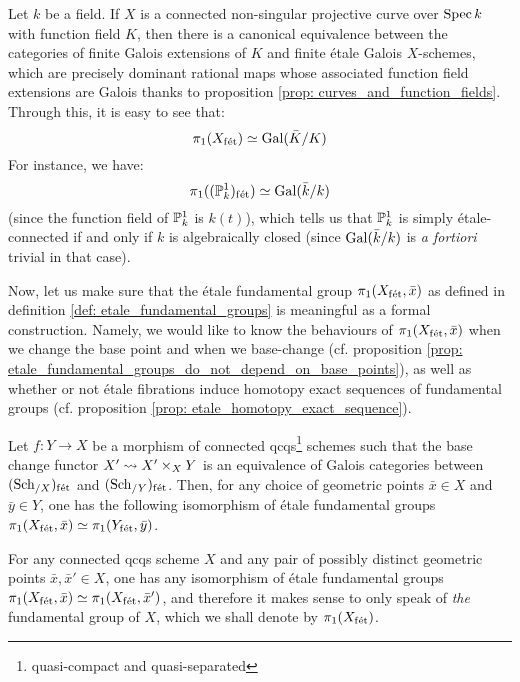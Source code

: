             \begin{example} \label{example: etale_fundamental_group_of_a_curve}
                Let $k$ be a field. If $X$ is a connected non-singular projective curve over $\Spec k$ with function field $K$, then there is a canonical equivalence between the categories of finite Galois extensions of $K$ and finite \'etale Galois $X$-schemes, which are precisely dominant rational maps whose associated function field extensions are Galois thanks to proposition \ref{prop: curves_and_function_fields}. Through this, it is easy to see that:
                    $$\pi_1(X_{\fet}) \cong \Gal(\bar{K}/K)$$
                For instance, we have:
                    $$\pi_1((\P^1_k)_{\fet}) \cong \Gal(\bar{k}/k)$$
                (since the function field of $\P^1_k$ is $k(t)$), which tells us that $\P^1_k$ is simply \'etale-connected if and only if $k$ is algebraically closed (since $\Gal(\bar{k}/k)$ is \textit{a fortiori} trivial in that case). 
            \end{example}
            
            Now, let us make sure that the \'etale fundamental group $\pi_1(X_{\fet}, \bar{x})$ as defined in definition \ref{def: etale_fundamental_groups} is meaningful as a formal construction. Namely, we would like to know the behaviours of $\pi_1(X_{\fet}, \bar{x})$ when we change the base point and when we base-change (cf. proposition \ref{prop: etale_fundamental_groups_do_not_depend_on_base_points}), as well as whether or not \'etale fibrations induce homotopy exact sequences of fundamental groups (cf. proposition \ref{prop: etale_homotopy_exact_sequence}). 
            \begin{proposition} \label{prop: etale_fundamental_groups_do_not_depend_on_base_points}
                \cite[\href{https://stacks.math.columbia.edu/tag/0BQA}{Tag 0BQA}]{stacks} Let $f: Y \to X$ be a morphism of connected qcqs\footnote{quasi-compact and quasi-separated} schemes such that the base change functor $X' \mapsto X' \x_X Y$ is an equivalence of Galois categories between $(\Sch_{/X})_{\fet}$ and $(\Sch_{/Y})_{\fet}$. Then, for any choice of geometric points $\bar{x} \in X$ and $\bar{y} \in Y$, one has the following isomorphism of \'etale fundamental groups $\pi_1(X_{\fet}, \bar{x}) \cong \pi_1(Y_{\fet}, \bar{y})$.
            \end{proposition}
            \begin{corollary} \label{coro: etale_fundamental_group_uniqueness}
                For any connected qcqs scheme $X$ and any pair of possibly distinct geometric points $\bar{x}, \bar{x}' \in X$, one has any isomorphism of \'etale fundamental groups $\pi_1(X_{\fet}, \bar{x}) \cong \pi_1(X_{\fet}, \bar{x}')$, and therefore it makes sense to only speak of \textit{the} fundamental group of $X$, which we shall denote by $\pi_1(X_{\fet})$.
            \end{corollary}
            
